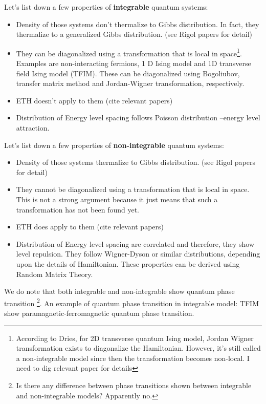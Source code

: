 \documentclass[11pt,a4paper]{article}
\begin{document}
Let's list down a few properties of \textbf{integrable} quantum systems: 
\begin{itemize}
\item Density of those systems don't thermalize to Gibbs distribution. In fact, they thermalize to a generalized Gibbs distribution. (see Rigol papers for detail) 
\item They can be diagonalized using a transformation that is local in space\footnote{According to Dries, for 2D transverse quantum Ising model, Jordan Wigner transformation exists to diagonalize the Hamiltonian. However, it's still called a non-integrable model since then the transformation becomes non-local. I need to dig relevant paper for details}. Examples are non-interacting fermions, 1 D Ising model and 1D transverse field Ising model (TFIM).  These can be diagonalized using Bogoliubov, transfer matrix method and Jordan-Wigner transformation, respectively.
\item ETH doesn't apply to them (cite relevant papers)
\item Distribution of Energy level spacing follows Poisson distribution --energy level attraction.
\end{itemize}


Let's list down a few properties of \textbf{non-integrable} quantum systems: 
\begin{itemize}
\item Density of those systems thermalize to Gibbs distribution.  (see Rigol papers for detail) 
\item They cannot be diagonalized using a transformation that is local in space. This is not a strong argument because it just means that such a transformation has not been found yet.
\item ETH does apply to them (cite relevant papers)
\item Distribution of Energy level spacing are correlated and therefore, they show level repulsion. They follow Wigner-Dyson or similar distributions, depending upon the details of Hamiltonian. These properties can be derived using Random Matrix Theory.
\end{itemize}


We do note that both integrable and non-integrable show quantum phase transition \footnote{Is there any difference between phase transitions shown between integrable and non-integrable models? Apparently no.}. An example of quantum phase transition in integrable model: TFIM show paramagnetic-ferromagnetic quantum phase transition.
\end{document}
